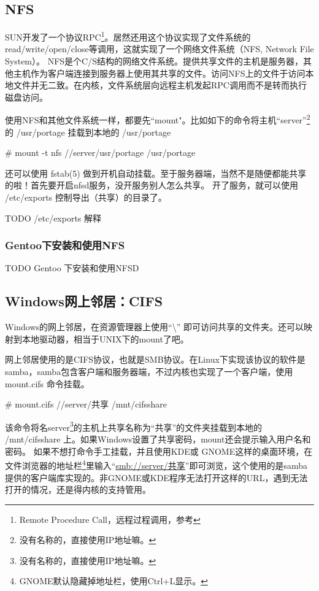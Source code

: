 \subsection{NFS}

SUN开发了一个协议RPC\footnote{Remote Procedure Call，远程过程调用，参考 }。居然还用这个协议实现了文件系统的read/write/open/close等调用，这就实现了一个网络文件系统（NFS, Network File System）。
NFS是个C/S结构的网络文件系统。提供共享文件的主机是服务器，其他主机作为客户端连接到服务器上使用其共享的文件。访问NFS上的文件于访问本地文件并无二致。在内核，文件系统层向远程主机发起RPC调用而不是转而执行磁盘访问。

使用NFS和其他文件系统一样，都要先``mount"。比如如下的命令将主机``server''\footnote{没有名称的，直接使用IP地址嘛。}的 /usr/portage 挂载到本地的	/usr/portage

\begin{code}
\# mount -t nfs //server/usr/portage	/usr/portage
\end{code}

还可以使用 fstab(5) 做到开机自动挂载。至于服务器端，当然不是随便都能共享的啦！首先要开启nfsd服务，没开服务别人怎么共享。
开了服务，就可以使用 /etc/exports 控制导出（共享）的目录了。

TODO /etc/exports 解释 %

\subsubsection{Gentoo下安装和使用NFS}
TODO Gentoo 下安装和使用NFSD

\subsection{Windows网上邻居：CIFS}

Windows的网上邻居，在资源管理器上使用``\textbackslash{}'' 即可访问共享的文件夹。还可以映射到本地驱动器，相当于UNIX下的mount了吧。

网上邻居使用的是CIFS协议，也就是SMB协议。在Linux下实现该协议的软件是samba，samba包含客户端和服务器端，不过内核也实现了一个客户端，使用 mount.cifs 命令挂载。

\begin{code}
\# mount.cifs //server/共享	 /mnt/cifsshare
\end{code}

该命令将名server\footnote{没有名称的，直接使用IP地址嘛。}的主机上共享名称为“共享”的文件夹挂载到本地的 /mnt/cifsshare 上。如果Windows设置了共享密码，mount还会提示输入用户名和密码。
如果不想打命令手工挂载，并且使用KDE或 GNOME这样的桌面环境，在文件浏览器的地址栏\footnote{GNOME默认隐藏掉地址栏，使用Ctrl+L显示。}里输入``\url{smb://server/共享}''即可浏览，这个使用的是samba提供的客户端库实现的。非GNOME或KDE程序无法打开这样的URL，遇到无法打开的情况，还是得内核的支持管用。

